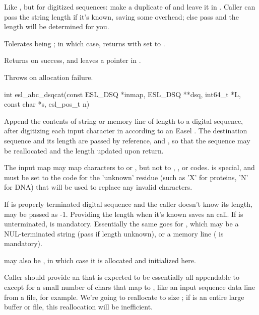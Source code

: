 \begin{sreapi}
Like , but for digitized sequences:
make a duplicate of  and leave it in .
Caller can pass the string length  if it's known, saving
some overhead; else pass  and the length will be
determined for you.

Tolerates  being ; in which case, returns
 with  set to .

Returns  on success, and leaves a pointer in .

Throws  on allocation failure.



\hypertarget{func:esl_abc_dsqcat()}
{\item[int esl\_abc\_dsqcat(const ESL\_DSQ *inmap, ESL\_DSQ **dsq, int64\_t *L, const char *s, esl\_pos\_t n)]}

Append the contents of string or memory line  of
length  to a digital sequence, after digitizing  
each input character in  according to an Easel
. The destination sequence and its length
are passed by reference,  and , so that
the sequence may be reallocated and the length updated
upon return.

The input map  may map characters to
 or , but not to ,
, or  codes.  is
special, and must be set to the code for the 'unknown'
residue (such as 'X' for proteins, 'N' for DNA) that
will be used to replace any invalid 
characters.

If  is properly terminated digital sequence and
the caller doesn't know its length,  may be passed
as -1. Providing the length when it's known saves an
 call. If  is unterminated, 
is mandatory. Essentially the same goes for , which
may be a NUL-terminated string (pass  if length unknown),
or a memory line ( is mandatory). 

 may also be , in which case it is allocated
and initialized here.

Caller should provide an  that is expected to be
essentially all appendable to  except for a small
number of chars that map to , like an
input sequence data line from a file, for example. We're
going to reallocate  to size ; if  is an
entire large buffer or file, this reallocation will be
inefficient.


\end{sreapi}
